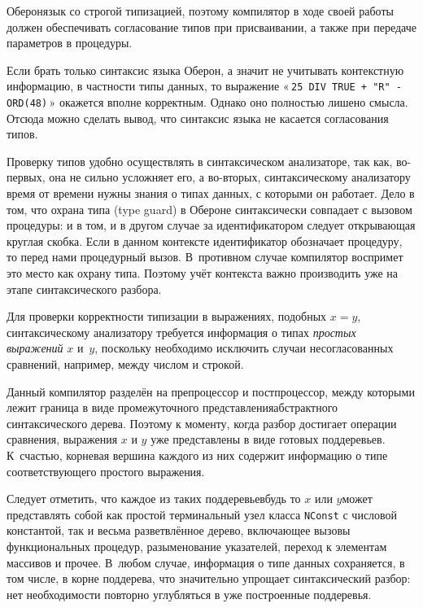 \documentclass[utf8]{lgu}
\newcommand{\tire}{\unskip\nobreak\thinspace\textemdash\thinspace}
\newcommand{\code}[1]{{\normalsize\texttt{#1}}}
\begin{document}
\firstparskip Оберон\tire язык со строгой типизацией, поэтому компилятор в ходе своей работы должен обеспечивать согласование типов при присваивании, а также при передаче параметров в процедуры.

Если брать только синтаксис языка Оберон, а значит не учитывать контекстную информацию, в частности типы данных, то выражение «\,\code{25 DIV TRUE + "R" - ORD(48)}\,» окажется вполне корректным. Однако оно полностью лишено смысла. Отсюда можно сделать вывод, что синтаксис языка не касается согласования типов.

Проверку типов удобно осуществлять в синтаксическом анализаторе, так как, во-первых, она не сильно усложняет его, а во-вторых, синтаксическому анализатору время от времени нужны знания о типах данных, с которыми он работает. Дело в том, что охрана типа (type guard) в Обероне синтаксически совпадает с вызовом процедуры: и в том, и в другом случае за идентификатором следует открывающая круглая скобка. Если в данном контексте идентификатор обозначает процедуру, то перед нами процедурный вызов. В~противном случае компилятор воспримет это место как охрану типа. Поэтому учёт контекста важно производить уже на этапе синтаксического разбора.

Для проверки корректности типизации в выражениях, подобных $x = y$, синтаксическому анализатору требуется информация о типах \textit{простых выражений} $x$ и~$y$, поскольку необходимо исключить случаи несогласованных сравнений, например, между числом и строкой.

Данный компилятор разделён на препроцессор и постпроцессор, между которыми лежит граница в виде промежуточного представления\tire абстрактного синтаксического дерева. Поэтому к моменту, когда разбор достигает операции сравнения, выражения $x$ и $y$ уже представлены в виде готовых поддеревьев. К~счастью, корневая вершина каждого из них содержит информацию о типе соответствующего простого выражения.

Следует отметить, что каждое из таких поддеревьев\tire будь то $x$ или $y$\tire может представлять собой как простой терминальный узел класса \code{NConst} с числовой константой, так и весьма разветвлённое дерево, включающее вызовы функциональных процедур, разыменование указателей, переход к элементам массивов и прочее. В~любом случае, информация о типе данных сохраняется, в том числе, в корне поддерева, что значительно упрощает синтаксический разбор: нет необходимости повторно углубляться в уже построенные поддеревья.
\end{document}
